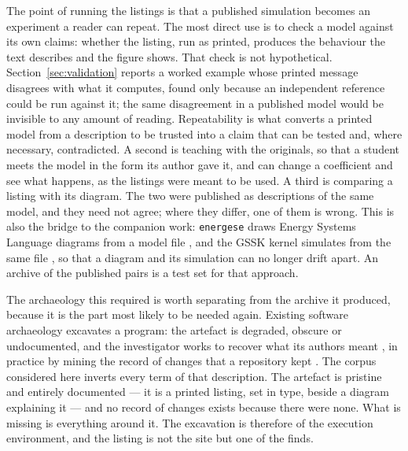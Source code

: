 The point of running the listings is that a published simulation becomes an experiment a reader can repeat. The most direct use is to check a model against its own claims: whether the listing, run as printed, produces the behaviour the text describes and the figure shows. That check is not hypothetical. Section~\ref{sec:validation} reports a worked example whose printed message disagrees with what it computes, found only because an independent reference could be run against it; the same disagreement in a published model would be invisible to any amount of reading. Repeatability is what converts a printed model from a description to be trusted into a claim that can be tested and, where necessary, contradicted. A second is teaching with the originals, so that a student meets the model in the form its author gave it, and can change a coefficient and see what happens, as the listings were meant to be used. A third is comparing a listing with its diagram. The two were published as descriptions of the same model, and they need not agree; where they differ, one of them is wrong. This is also the bridge to the companion work: \texttt{energese} draws Energy Systems Language diagrams from a model file \citep{energese}, and the GSSK kernel simulates from the same file \citep{gssk}, so that a diagram and its simulation can no longer drift apart. An archive of the published pairs is a test set for that approach.

The archaeology this required is worth separating from the archive it produced, because it is the part most likely to be needed again. Existing software archaeology excavates a program: the artefact is degraded, obscure or undocumented, and the investigator works to recover what its authors meant \citep{huntThomas2002}, in practice by mining the record of changes that a repository kept \citep{robles2005,spinellis2021}. The corpus considered here inverts every term of that description. The artefact is pristine and entirely documented --- it is a printed listing, set in type, beside a diagram explaining it --- and no record of changes exists because there were none. What is missing is everything around it. The excavation is therefore of the execution environment, and the listing is not the site but one of the finds.

